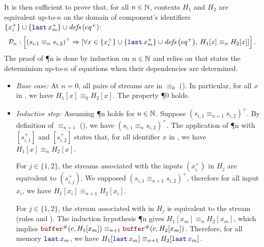 \begin{skippableproof}
    It is then sufficient to prove that, for all $n \in \mathbb{N}$, contexts $H_1$ and $H_2$ are
    equivalent up-to-$n$ on the domain of component's identifiers $\{x_i^+\} \cup \{\last{x_m}^+\}
        \cup \defs{eq^+}$:
    \begin{equation*}
        \P{n}:
        \left[\left(s_{i, 1} \equiv_n s_{i, 2}\right)^+ \Rightarrow [\forall x \in \{x_i^+\}
        \cup \{\last{x_m}^+\} \cup \defs{eq^+}, \, H_1[x] \equiv_n H_2[x]]\right].
    \end{equation*}
    The proof of \P{n} is done by induction on $n \in \mathbb{N}$ and relies on  that states the determinism up-to-$n$ of \GRSync
    equations when their dependencies are determined.

    \begin{itemize}
        \item \textit{Base case:} At $n = 0$, all pairs of streams are in $\equiv_0$ (). In particular, for all $x$ in
              , we have $H_1[x] \equiv_0 H_2[x]$. The property \P{0} holds.

        \item \textit{Inductive step:} Assuming \P{n} holds for $n \in \mathbb{N}$.
              Suppose $\left(s_{i, 1} \equiv_{n+1} s_{i, 2}\right)^+$. By definition of
              $\equiv_{n+1}$ (), we have
              $\left(s_{i, 1} \equiv_n s_{i, 2}\right)^+$. The application of \P{n} with
              $[s_{i, 1}^+]$ and $[s_{i, 2}^+]$ states that, for all identifier $x$ in ,
              we have $H_1[x] \equiv_n H_2[x]$.

              For $j \in \{1,2\}$, the streams associated with the inputs $(x_i^+)$ in $H_j$ are
              equivalent to $(s_{i, j}^+)$.
              We supposed $\left(s_{i, 1} \equiv_{n+1} s_{i, 2}\right)^+$, therefore for all input
              $x_i$, we have $H_1[x_i] \equiv_{n+1} H_2[x_i]$.

              For $j \in \{1,2\}$, the stream associated with  in $H_j$ is equivalent to 
              the stream  (\cf rules 
              and ). The induction hypothesis
              \P{n} gives $H_1[x_m] \equiv_n H_2[x_m]$, which implies $\buffer{c}
                  {H_1[x_m]} \equiv_{n+1} \buffer{c}{H_2[x_m]}$. Therefore, for all memory
              $\last{x_m}$, we have $H_1[\last{x_m}] \equiv_{n+1} H_2[\last{x_m}]$.


\end{itemize}
\end{skippableproof}
